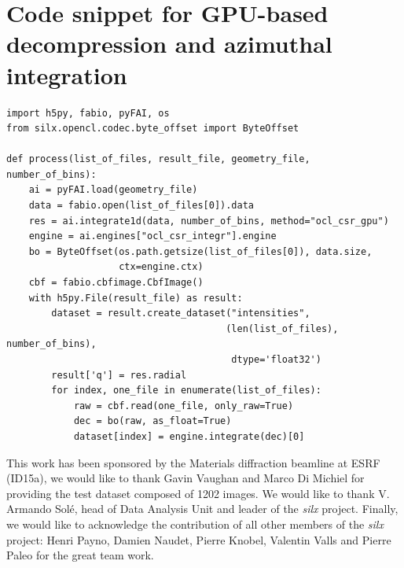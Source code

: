 \documentclass[preprint]{iucr}              %
\begin{document}
\goodbreak

\section{Code snippet for GPU-based decompression and azimuthal integration}
\begin{minipage}{\linewidth}
\label{parallelsnippet}
\begin{verbatim}
import h5py, fabio, pyFAI, os
from silx.opencl.codec.byte_offset import ByteOffset

def process(list_of_files, result_file, geometry_file, number_of_bins):
    ai = pyFAI.load(geometry_file)
    data = fabio.open(list_of_files[0]).data
    res = ai.integrate1d(data, number_of_bins, method="ocl_csr_gpu")
    engine = ai.engines["ocl_csr_integr"].engine
    bo = ByteOffset(os.path.getsize(list_of_files[0]), data.size,
                    ctx=engine.ctx) 
    cbf = fabio.cbfimage.CbfImage()
    with h5py.File(result_file) as result:
        dataset = result.create_dataset("intensities", 
                                       (len(list_of_files), number_of_bins),
                                        dtype='float32') 
        result['q'] = res.radial 
        for index, one_file in enumerate(list_of_files):
            raw = cbf.read(one_file, only_raw=True)
            dec = bo(raw, as_float=True)
            dataset[index] = engine.integrate(dec)[0]
\end{verbatim}
\end{minipage}

\goodbreak

This work has been sponsored by the Materials diffraction beamline at ESRF
(ID15a), we would like to thank Gavin Vaughan and Marco Di Michiel for
providing the test dataset composed of 1202 images.
We would like to thank V. Armando Solé, head of Data Analysis Unit and leader
of the \textit{silx} project. 
Finally, we would like to acknowledge the contribution of all other members
of the \textit{silx} project:
Henri Payno, Damien Naudet, Pierre Knobel, Valentin Valls and
Pierre Paleo for the great team work.



\end{document}
